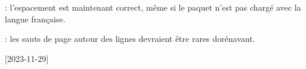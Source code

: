 \tdocsep




\begin{tdocfix}[version = 1.0.1, date = 2023-12-08]
    \item {}: l'espacement est maintenant correct, même si le paquet  n'est pas chargé avec la langue française.

    \item {}: les sauts de page autour des lignes  devraient être rares dorénavant.
\end{tdocfix}

\tdocsep




[2023-11-29]


